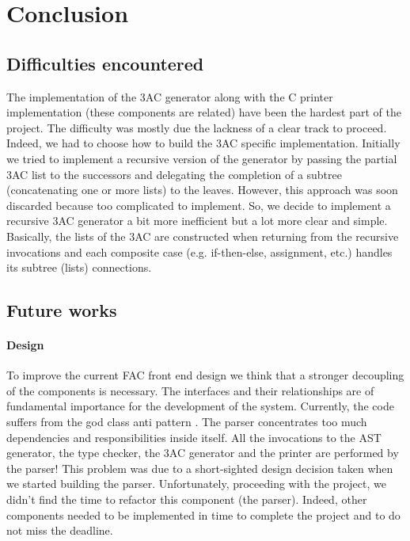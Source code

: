 \section{Conclusion}
\subsection{Difficulties encountered}
The implementation of the 3AC generator along with the C printer implementation 
(these components are related) have been the hardest part of the project. The 
difficulty was mostly due the lackness of a clear track to proceed. Indeed, we
had to choose how to build the 3AC specific implementation. Initially we tried
to implement a recursive version of the generator by passing the partial 3AC 
list to the successors and delegating the completion of a subtree 
(concatenating one or more lists) to the leaves. However, this approach was soon 
discarded because too complicated to implement. So, we decide to implement a 
recursive 3AC generator a bit more inefficient but a lot more clear and simple. 
Basically, the lists of the 3AC are constructed when returning from the 
recursive invocations and each composite case (e.g. if-then-else, assignment, 
etc.) handles its subtree (lists) connections.
\subsection{Future works}
\paragraph{Design}
To improve the current FAC front end design we think that a stronger decoupling 
of the components is necessary. The interfaces and their relationships are of 
fundamental importance for the development of the system. Currently, the code 
suffers from the god class anti pattern \cite{Martin:2008:CCH:1388398}. 
The parser concentrates too much dependencies and responsibilities inside 
itself. All the invocations to the AST generator, the type checker, the 3AC 
generator and the printer are performed by the parser! This problem was due to a
short-sighted design decision taken when we started building the parser. 
Unfortunately, proceeding with the project, we didn't find the time to refactor 
this component (the parser). Indeed, other components needed to be implemented 
in time to complete the project and to do not miss the deadline.

